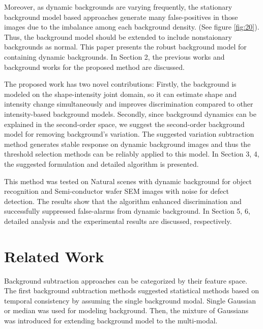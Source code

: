 \documentclass[conference]{IEEEtran}
\begin{document}
Moreover, as dynamic backgrounds are varying frequently, the stationary background model based approaches generate many false-positives in those images due to the imbalance among each background density. (See figure \ref{fig:20}). Thus, the background model should be extended to include nonstaionary backgrounds as normal. 
This paper presents the robust background model for containing dynamic backgrounds. In Section 2, the previous works and background works for the proposed method are discussed. 

The proposed work has two novel contributions: Firstly, the background is modeled on the shape-intensity joint domain, so it can estimate shape and intensity change simultaneously and improves discrimination compared to other intensity-based background models. Secondly, since background dynamics can be explained in the second-order space, we suggest the second-order background model for removing background’s variation. The suggested variation subtraction method generates stable response on dynamic background images and thus the threshold selection methods can be reliably applied to this model. In Section 3, 4, the suggested formulation and detailed algorithm is presented.

This method was tested on Natural scenes with dynamic background for object recognition and Semi-conductor wafer SEM images with noise for defect detection. The results show that the algorithm enhanced discrimination and successfully suppressed false-alarms from dynamic background. In Section 5, 6, detailed analysis and the experimental results are discussed, respectively.



\section{Related Work}

Background subtraction approaches can be categorized by their feature space. The first background subtraction methods \cite{Piccardi, Wren, Cucchiara} suggested statistical methods based on temporal consistency by assuming the single background modal. Single Gaussian \cite{Wren} or median \cite{Cucchiara} was used for modeling background. Then, the mixture of Gaussians \cite{Stauffer} was introduced for extending background model to the multi-modal. 
\end{document}
